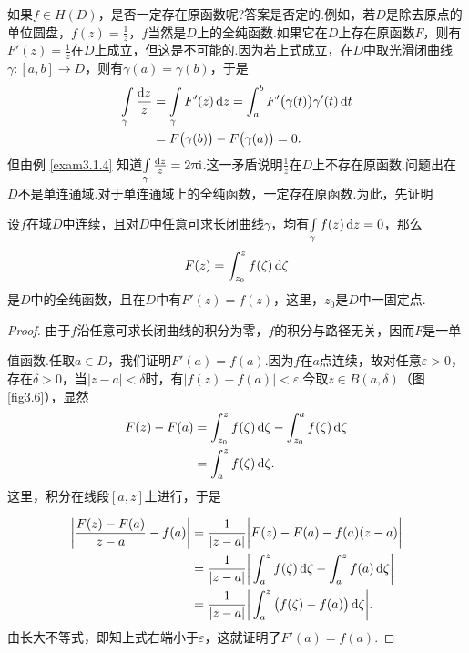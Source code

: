 如果$f\in H(D)$，是否一定存在原函数呢?答案是否定的.例如，若$D$是除去原点的单位圆盘，$f(z)=\frac1z$，$f$当然是$D$上的全纯函数.如果它在$D$上存在原函数$F$，则有$F'(z)=\frac1z$在$D$上成立，但这是不可能的.因为若上式成立，在$D$中取光滑闭曲线$\gamma:[a,b]\to D$，则有$\gamma(a)=\gamma(b)$，于是
\begin{align*}
  \int\limits_\gamma\frac{\mathop{}\!\mathrm dz}z & = \int\limits_\gamma F'(z)\mathop{}\!\mathrm dz
  = \int_a^bF'\big(\gamma(t)\big)\gamma'(t)\mathop{}\!\mathrm{d} t\\
  & = F\big(\gamma(b)\big)-F\big(\gamma(a)\big)=0.
\end{align*}
但由例 \ref{exam3.1.4} 知道$\int\limits_\gamma\frac{\mathop{}\!\mathrm dz}z=2\uppi\mathrm i$.这一矛盾说明$\frac1z$在$D$上不存在原函数.问题出在$D$不是单连通域.对于单连通域上的全纯函数，一定存在原函数.为此，先证明
\begin{theorem}\label{thm3.3.2}
  设$f$在域$D$中连续，且对$D$中任意可求长闭曲线$\gamma$，均有$\int\limits_\gamma f(z)\mathop{}\!\mathrm dz=0$，那么
  \[
    F(z) = \int_{z_0}^zf(\zeta)\mathop{}\!\mathrm{d} \zeta
  \]
  是$D$中的全纯函数，且在$D$中有$F'(z)=f(z)$，这里，$z_0$是$D$中一固定点.
\end{theorem}
\begin{proof}
  由于$f$沿任意可求长闭曲线的积分为零，$f$的积分与路径无关，因而$F$是一单\\[1mm]
  \begin{minipage}[b]{0,7\textwidth}
    值函数.任取$a\in D$，我们证明$F'(a)=f(a)$.因为$f$在$a$点连续，故对任意$\varepsilon>0$，存在$\delta>0$，当$|z-a|<\delta$时，有$|f(z)-f(a)|<\varepsilon$.今取$z\in B(a,\delta)$（图 \ref{fig3.6}），显然
    \begin{align*}
      F(z) - F(a) & = \int_{z_0}^zf(\zeta)\mathop{}\!\mathrm{d} \zeta-\int_{z_0}^af(\zeta)\mathop{}\!\mathrm{d} \zeta\\
      & = \int_a^zf(\zeta)\mathop{}\!\mathrm{d} \zeta.
    \end{align*}
    这里，积分在线段$[a,z]$上进行，于是
  \end{minipage}
\begin{minipage}[b]{0.3\textwidth}
  \centering
\end{minipage}
  \begin{align*}
    \bigg|\frac{F(z)-F(a)}{z-a}-f(a)\bigg|
    & = \frac1{|z-a|}\bigg|F(z)-F(a)-f(a)(z-a)\bigg|\\
    & = \frac1{|z-a|}\bigg|\int_a^zf(\zeta)\mathop{}\!\mathrm{d} \zeta-\int_a^zf(a)\mathop{}\!\mathrm{d} \zeta\bigg|\\
    & = \frac1{|z-a|}\bigg|\int_a^z\big(f(\zeta)-f(a)\big)\mathop{}\!\mathrm{d} \zeta\bigg|.
  \end{align*}
  由长大不等式，即知上式右端小于$\varepsilon$，这就证明了$F'(a)=f(a)$.
\end{proof}

